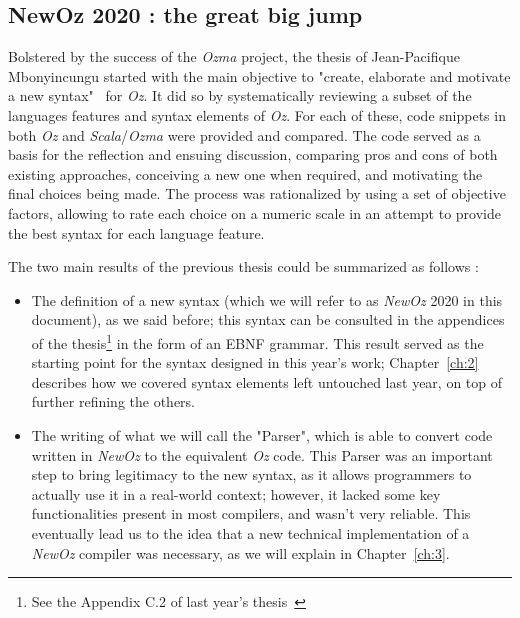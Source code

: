 \subsection{NewOz 2020 : the great big jump}\label{subsec:ch1-newoz2020}
Bolstered by the success of the \textit{Ozma} project, the thesis of Jean-Pacifique Mbonyincungu started with the main objective to "create, elaborate and motivate a new syntax"~\cite{jpthesis} for \textit{Oz}.
It did so by systematically reviewing a subset of the languages features and syntax elements of \textit{Oz}.
For each of these, code snippets in both \textit{Oz} and \textit{Scala}/\textit{Ozma} were provided and compared.
The code served as a basis for the reflection and ensuing discussion, comparing pros and cons of both existing approaches, conceiving a new one when required, and motivating the final choices being made.
The process was rationalized by using a set of objective factors, allowing to rate each choice on a numeric scale in an attempt to provide the best syntax for each language feature.\newline

The two main results of the previous thesis could be summarized as follows :
\begin{itemize}
    \item The definition of a new syntax (which we will refer to as \textit{NewOz} 2020 in this document), as we said before;
    this syntax can be consulted in the appendices of the thesis\footnote{See the Appendix C.2 of last year's thesis~\cite{jpthesis}} in the form of an EBNF grammar.
    This result served as the starting point for the syntax designed in this year's work;
    Chapter~\ref{ch:2} describes how we covered syntax elements left untouched last year, on top of further refining the others.
    \item The writing of what we will call the "Parser", which is able to convert code written in \textit{NewOz} to the equivalent \textit{Oz} code.
    This Parser was an important step to bring legitimacy to the new syntax, as it allows programmers to actually use it in a real-world context;
    however, it lacked some key functionalities present in most compilers, and wasn't very reliable.
    This eventually lead us to the idea that a new technical implementation of a \textit{NewOz} compiler was necessary, as we will explain in Chapter~\ref{ch:3}.
\end{itemize}

